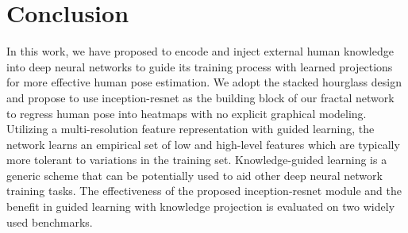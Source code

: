 \documentclass[journal ]{IEEEtran}
\begin{document}
\section{Conclusion}
\label{sec:conclusions}
In this work, we have proposed to encode and inject external human knowledge into deep neural networks to guide its training process with learned projections for more effective human pose estimation. 
We adopt the stacked hourglass design and propose to use inception-resnet as the building block of our fractal network to regress human pose into heatmaps with no explicit graphical modeling.
Utilizing a multi-resolution feature representation with guided learning, the network learns an empirical set of low and high-level features which are typically more tolerant to variations in the training set.
Knowledge-guided learning is a generic scheme that can be potentially used to aid other deep neural network training tasks.
The effectiveness of the proposed inception-resnet module and the benefit in guided learning with knowledge projection is evaluated on two widely used benchmarks. 























\ifCLASSOPTIONcaptionsoff
  \newpage
\fi













\end{document}
